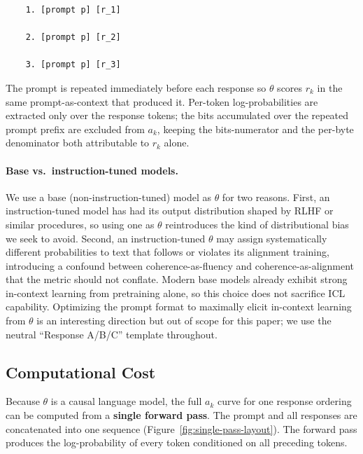 \begin{verbatim}
    1. [prompt p] [r_1]

    2. [prompt p] [r_2]

    3. [prompt p] [r_3]
\end{verbatim}

The prompt is repeated immediately before each response so $\theta$ scores $r_k$ in the same prompt-as-context that produced it.
Per-token log-probabilities are extracted only over the response tokens; the bits accumulated over the repeated prompt prefix are excluded from $a_k$, keeping the bits-numerator and the per-byte denominator both attributable to $r_k$ alone.

\paragraph{Base vs.\ instruction-tuned models.} We use a base (non-instruction-tuned) model as $\theta$ for two reasons.
First, an instruction-tuned model has had its output distribution shaped by RLHF or similar procedures, so using one as $\theta$ reintroduces the kind of distributional bias we seek to avoid.
Second, an instruction-tuned $\theta$ may assign systematically different probabilities to text that follows or violates its alignment training, introducing a confound between coherence-as-fluency and coherence-as-alignment that the metric should not conflate.
Modern base models already exhibit strong in-context learning from pretraining alone, so this choice does not sacrifice ICL capability.
Optimizing the prompt format to maximally elicit in-context learning from $\theta$ is an interesting direction but out of scope for this paper; we use the neutral ``Response A/B/C'' template throughout.

\subsection{Computational Cost}\label{sec:cost}

Because $\theta$ is a causal language model, the full $a_k$ curve for one response ordering can be computed from a \textbf{single forward pass}.
The prompt and all responses are concatenated into one sequence (Figure~\ref{fig:single-pass-layout}).
The forward pass produces the log-probability of every token conditioned on all preceding tokens.

